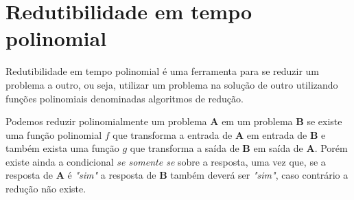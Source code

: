 \section{Redutibilidade em tempo polinomial}
Redutibilidade em tempo polinomial é uma ferramenta para se reduzir um problema a outro, ou seja, utilizar um problema na solução de outro utilizando funções polinomiais denominadas algoritmos de redução.

Podemos reduzir polinomialmente um problema \textbf{A} em um problema \textbf{B} se existe uma função polinomial $f$ que transforma a entrada de \textbf{A} em entrada de \textbf{B} e também exista uma função $g$ que transforma a saída de \textbf{B} em saída de \textbf{A}. Porém existe ainda a condicional \textit{se somente se} sobre a resposta, uma vez que, se a resposta de \textbf{A} é \textit{"sim"} a resposta de \textbf{B} também deverá ser \textit{"sim"}, caso contrário a redução não existe.
